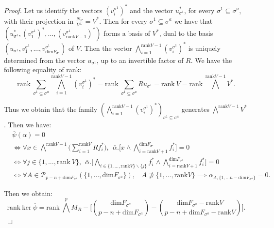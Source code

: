 \documentclass{article}
\begin{document}
\begin{proof}
    Let us identify the vectors $(v_i^{\sigma^1})^*$ and the vector $u_{\sigma^1}^*$, for every $\sigma^1 \subseteq \sigma^a$, with their projection in $\frac{N_R}{V^{\perp}}=V^*$. Then for every $\sigma^1 \subseteq \sigma^a$ we have that $(u_{\sigma^1}^*,(v_1^{\sigma^1})^*,...,(v_{\mathrm{rank}V-1}^{\sigma^1})^*)$ forms a basis of $V^*$, dual to the basis $(u_{\sigma^1},v^{\sigma^1}_1,...,v^{\sigma^1}_{\mathrm{dim}F_{\sigma^a}})$ of $V$. Then the vector $\bigwedge_{i=1}^{\mathrm{rank}V -1}(v_i^{\sigma^1})^*$ is uniquely determined from the vector $u_{\sigma^1}$, up to an invertible factor of $R$. We have the following equality of rank:
    \begin{equation*}
        \mathrm{rank} ~ \sum_{\sigma^1 \subseteq \sigma^a} \bigwedge_{i=1}^{\mathrm{rank}V -1}(v_i^{\sigma^1})^* = \mathrm{rank}~ \sum_{\sigma^1 \subseteq \sigma^a} Ru_{\sigma^1} = \mathrm{rank}~ V = \mathrm{rank}~\bigwedge^{\mathrm{rank} V -1}V^*.
    \end{equation*}

    Thus we obtain that the family $( \bigwedge_{i=1}^{\mathrm{rank}V-1}(v_i^{\sigma^1})^*)_{\sigma^1 \subseteq \sigma^a}$ generates $\bigwedge^{\mathrm{rank} V -1}V^*$. Then we have:
    \begin{align*}
        &\overline{\psi}(\alpha) = 0 \\
        &\iff \forall x \in\bigwedge^{\mathrm{rank} V -1}\Bigg(\sum_{i=1}^{\mathrm{rank}V}Rf_i^*\Bigg), ~~\overline{\alpha}.\Bigg[x\wedge\bigwedge_{i=\mathrm{rank}V+1}^{\mathrm{dim}F_{\sigma^a}} f_i^*\Bigg] =0 \\
        & \iff \forall j \in \{1,...,\mathrm{rank}~V\},~~\overline{\alpha}.\Bigg[ \bigwedge_{i\in \{1,...,\mathrm{rank}V\}\backslash \{j\}} f_i^*\wedge\bigwedge_{i=\mathrm{rank}V+1}^{\mathrm{dim}F_{\sigma^a}} f_i^*\Bigg] =0 \\
        & \iff \forall A \in \mathcal{P}_{p-n+\mathrm{dim} F_{\sigma^a}}(\{1,...,\mathrm{dim}F_{\sigma^a}\}), ~~~~A \not\supseteq \{1,...,\mathrm{rank}V\} \implies\alpha_{A,\{1,...n-\mathrm{dim} F_{\sigma^a}\}}=0.
    \end{align*}

    Then we obtain:
    \begin{equation*}
        \mathrm{rank} ~\mathrm{ker} ~\overline{\psi}  = \mathrm{rank} ~ \bigwedge^p M_R - \Bigg[\binom{\mathrm{dim}F_{\sigma^a}}{p-n+\mathrm{dim}F_{\sigma^a}}-\binom{\mathrm{dim}F_{\sigma^a}-\mathrm{rank}V}{p-n+\mathrm{dim}F_{\sigma^a}-\mathrm{rank}V}\Bigg].
    \end{equation*}


\end{proof}
\end{document}
